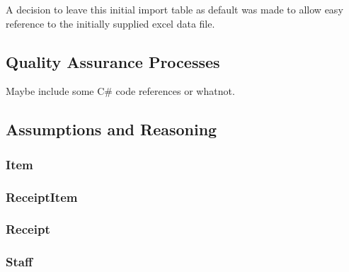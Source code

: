 \documentclass{article}
\begin{document}
        \noindent
        A decision to leave this initial import table as default
        was made to allow easy reference to the initially supplied
        excel data file.

        \newpage




        \subsection{Quality Assurance Processes}
        \label{sec:QAP}
            Maybe include some C\# code references or whatnot.

        \newpage
        \subsection{Assumptions and Reasoning}
        \label{sec:AR}
            \subsubsection{Item}

            \subsubsection{ReceiptItem}

            \subsubsection{Receipt}

            \subsubsection{Staff}
\end{document}
